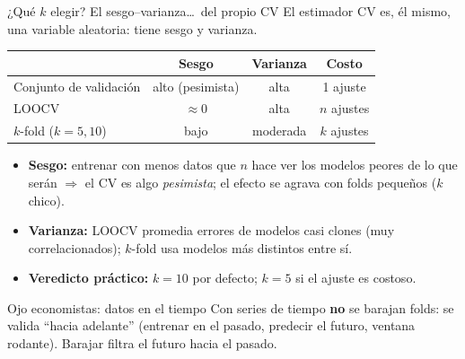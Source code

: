 \documentclass{beamer}
\newcommand{\1}{\mathbb{I}}
\begin{document}
\begin{frame}{¿Qué $k$ elegir? El sesgo--varianza\ldots\ del propio CV}
\small
El estimador $\mathrm{CV}$ es, él mismo, una variable aleatoria: tiene sesgo y varianza.
\pause

\vspace{0.2cm}
\begin{center}
\footnotesize
\begin{tabular}{lccc}
\hline
 & Sesgo & Varianza & Costo \\
\hline
Conjunto de validación & alto (pesimista) & alta & 1 ajuste \\
LOOCV & $\approx 0$ & alta & $n$ ajustes \\
$k$-fold ($k=5,10$) & bajo & moderada & $k$ ajustes \\
\hline
\end{tabular}
\end{center}
\pause

\vspace{0.2cm}
\begin{itemize}\itemsep4pt
  \item \textbf{Sesgo:} entrenar con menos datos que $n$ hace ver los modelos peores de lo que serán $\Rightarrow$ el CV es algo \emph{pesimista}; el efecto se agrava con folds pequeños ($k$ chico).
  \item \textbf{Varianza:} LOOCV promedia errores de modelos casi clones (muy correlacionados); $k$-fold usa modelos más distintos entre sí.
  \item \textbf{Veredicto práctico:} $k = 10$ por defecto; $k = 5$ si el ajuste es costoso.
\end{itemize}
\pause

\begin{block}{Ojo economistas: datos en el tiempo}
Con series de tiempo \textbf{no} se barajan folds: se valida ``hacia adelante'' (entrenar en el pasado, predecir el futuro, ventana rodante). Barajar filtra el futuro hacia el pasado.
\end{block}
\end{frame}
\end{document}
